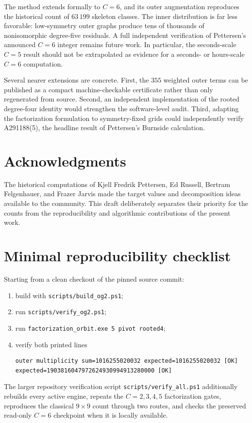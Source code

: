 \documentclass[11pt]{article}
\theoremstyle{definition}
\theoremstyle{remark}
\begin{document}
The method extends formally to $C=6$, and its outer augmentation reproduces
the historical count of $63\,199$ skeleton classes.  The inner distribution is
far less favorable: low-symmetry outer graphs produce tens of thousands of
nonisomorphic degree-five residuals.  A full independent verification of
Pettersen's announced $C=6$ integer remains future work.  In particular, the
seconds-scale $C=5$ result should not be extrapolated as evidence for a
seconds- or hours-scale $C=6$ computation.

Several nearer extensions are concrete.  First, the $355$ weighted outer
terms can be published as a compact machine-checkable certificate rather than
only regenerated from source.  Second, an independent implementation of the
rooted degree-four identity would strengthen the software-level audit.
Third, adapting the factorization formulation to symmetry-fixed grids could
independently verify A291188(5), the headline result of Pettersen's Burnside
calculation.

\section*{Acknowledgments}

The historical computations of Kjell Fredrik Pettersen, Ed Russell, Bertram
Felgenhauer, and Frazer Jarvis made the target values and decomposition ideas
available to the community.  This draft deliberately separates their
priority for the counts from the reproducibility and algorithmic contributions
of the present work.




\appendix

\section{Minimal reproducibility checklist}

Starting from a clean checkout of the pinned source commit:
\begin{enumerate}
  \item build with \texttt{scripts/build\_og2.ps1};
  \item run \texttt{scripts/verify\_og2.ps1};
  \item run \texttt{factorization\_orbit.exe 5 pivot rooted4};
  \item verify both printed lines
\begin{verbatim}
outer multiplicity sum=1016255020032 expected=1016255020032 [OK]
expected=1903816047972624930994913280000 [OK]
\end{verbatim}
\end{enumerate}
The larger repository verification script
\texttt{scripts/verify\_all.ps1} additionally rebuilds every
active engine, repeats the $C=2,3,4,5$ factorization gates, reproduces the
classical $9\times9$ count through two routes, and checks the preserved
read-only $C=6$ checkpoint when it is locally available.
\end{document}
